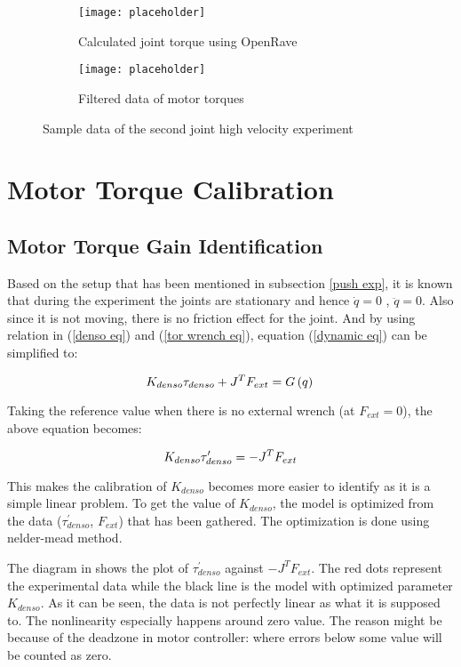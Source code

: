 \begin{figure}[h]
  \begin{subfigure}[t]{0.5\textwidth}
    \centering
    \texttt{[image: placeholder]} 
    \caption{Calculated joint torque using OpenRave}
  \end{subfigure}
  \begin{subfigure}[t]{0.5\textwidth}
    \centering
    \texttt{[image: placeholder]}
    \caption{Filtered data of motor torques}
  \end{subfigure}
  \caption{Sample data of the second joint high velocity experiment}
  \label{fig: fric result}
\end{figure}


\section{Motor Torque Calibration}
\subsection{Motor Torque Gain Identification}
Based on the setup that has been mentioned in subsection \ref{push exp}, it is known that during the experiment the joints are stationary and hence $\dot{q} = 0$ , $\ddot{q} = 0$. Also since it is not moving, there is no friction effect for the joint. And by using relation in (\ref{denso eq}) and (\ref{tor wrench eq}), equation (\ref{dynamic eq}) can be simplified to: 

\begin{equation}
  K_{denso} \tau_{denso} + J^{T} F_{ext}  = G\left(q \right) \\
\end{equation}

Taking the reference value when there is no external wrench (at $F_{ext} = 0$), the above equation becomes:

\begin{equation}
  K_{denso} \tau_{denso}^{\prime} = - J^{T} F_{ext} \\
\end{equation}

This makes the calibration of $K_{denso}$ becomes more easier to identify as it is a simple linear problem. To get the value of $K_{denso}$, the model is optimized from the data ($\tau_{denso}^{\prime}$, $F_{ext}$) that has been gathered. The optimization is done using nelder-mead method. 

The diagram in  shows the plot of $\tau_{denso}^{\prime}$ against $- J^{T} F_{ext}$. The red dots represent the experimental data while the black line is the model with optimized parameter $K_{denso}$. As it can be seen, the data is not perfectly linear as what it is supposed to. The nonlinearity especially happens around zero value. The reason might be because of the deadzone in motor controller: where errors below some value will be counted as zero. 

